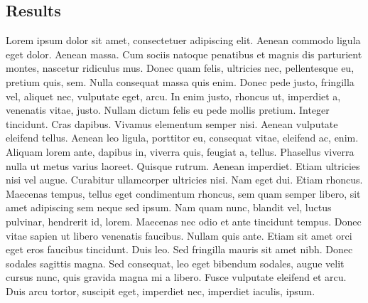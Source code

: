 \documentclass[a1paper]{article}
\begin{document}
\newpage

\begin{posterbox}
	\vspace{-10mm}
	\raggedright

	\section*{Results}
	Lorem ipsum dolor sit amet, consectetuer adipiscing elit. Aenean commodo ligula eget dolor. Aenean massa. Cum sociis natoque penatibus et magnis dis parturient montes, nascetur ridiculus mus. Donec quam felis, ultricies nec, pellentesque eu, pretium quis, sem. Nulla consequat massa quis enim. Donec pede justo, fringilla vel, aliquet nec, vulputate eget, arcu. In enim justo, rhoncus ut, imperdiet a, venenatis vitae, justo. Nullam dictum felis eu pede mollis pretium. Integer tincidunt. Cras dapibus. Vivamus elementum semper nisi. Aenean vulputate eleifend tellus. Aenean leo ligula, porttitor eu, consequat vitae, eleifend ac, enim. Aliquam lorem ante, dapibus in, viverra quis, feugiat a, tellus. Phasellus viverra nulla ut metus varius laoreet. Quisque rutrum. Aenean imperdiet. Etiam ultricies nisi vel augue. Curabitur ullamcorper ultricies nisi. Nam eget dui. Etiam rhoncus. Maecenas tempus, tellus eget condimentum rhoncus, sem quam semper libero, sit amet adipiscing sem neque sed ipsum. Nam quam nunc, blandit vel, luctus pulvinar, hendrerit id, lorem. Maecenas nec odio et ante tincidunt tempus. Donec vitae sapien ut libero venenatis faucibus. Nullam quis ante. Etiam sit amet orci eget eros faucibus tincidunt. Duis leo. Sed fringilla mauris sit amet nibh. Donec sodales sagittis magna. Sed consequat, leo eget bibendum sodales, augue velit cursus nunc, quis gravida magna mi a libero. Fusce vulputate eleifend et arcu. Duis arcu tortor, suscipit eget, imperdiet nec, imperdiet iaculis, ipsum.
\end{posterbox}

\vfill
\end{document}
